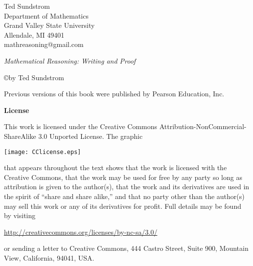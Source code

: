 \newpage
\thispagestyle{empty}

\newpar
Ted Sundstrom \\
Department of Mathematics \\
Grand Valley State University \\
Allendale, MI  49401 \\
mathreasoning@gmail.com


\quarter
\newpar
\emph{Mathematical Reasoning: Writing and Proof}

\noindent
\copyright \the\year by Ted Sundstrom

\newpar
Previous versions of this book were published by Pearson Education, Inc.

\half
\newpar
\textbf{\huge{License}}

\newpar


This work is licensed under the Creative Commons Attribution-NonCommercial-ShareAlike
3.0 Unported License. The graphic
\begin{center}
\texttt{[image: CClicense.eps]}
\end{center}
that appears throughout the text shows that the work is licensed with the Creative Commons, that
the work may be used for free by any party so long as attribution is given to the author(s), that the
work and its derivatives are used in the spirit of ``share and share alike,'' and that no party other than the author(s) may
sell this work or any of its derivatives for profit. Full details may be found by visiting
\begin{center}
\href{http://creativecommons.org/licenses/by-nc-sa/3.0/}%
{http://creativecommons.org/licenses/by-nc-sa/3.0/}
\end{center}
or sending a letter to Creative Commons, 444 Castro Street, Suite 900, Mountain View, California,
94041, USA.


\endinput
